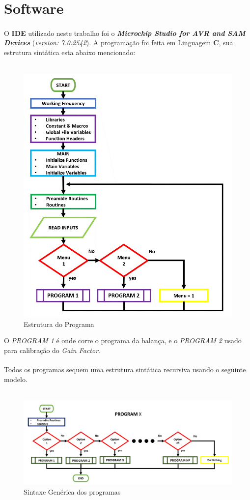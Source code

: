 \chapter{Software}
O \textbf{IDE} utilizado neste trabalho foi o \textbf{\textit{{Microchip Studio for AVR\textsuperscript{\textregistered} and SAM Devices}}} (\textit{version: 7.0.2542}). A programação foi feita em Linguagem \textbf{C}, sua estrutura sintática esta abaixo mencionado:
\\
\\
\begin{figure}[H]
	\centering
	\includegraphics[scale=0.6]{./image/PESTA/flowchart/Main_Program_1.jpg}
	\caption{Estrutura do Programa}
	\label{Main_Program_1}
\end{figure}
O \textit{PROGRAM 1} é onde corre o programa da balança, e o \textit{PROGRAM 2} usado para calibração do \textit{Gain Factor}.
\\
\\
Todos os programas sequem uma estrutura sintática recursiva usando o seguinte modelo.
\\
\\
\begin{figure}[H]
	\centering
	\includegraphics[scale=0.40]{./image/PESTA/flowchart/Generic_structure.jpg}
	\caption{Sintaxe Genérica dos programas}
	\label{Geneic_structure}
\end{figure}
